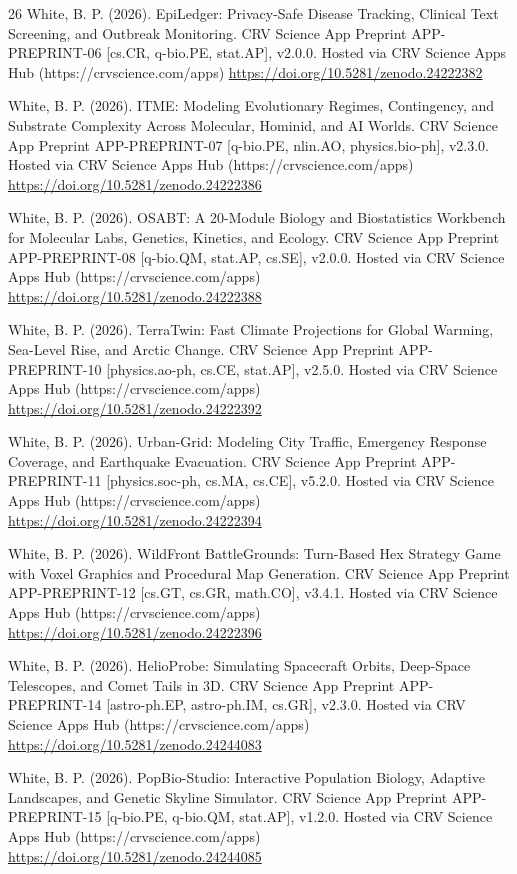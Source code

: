 \documentclass[10pt,letterpaper]{article}
\begin{document}
\begin{thebibliography}{26}
 White, B. P. (2026). EpiLedger: Privacy-Safe Disease Tracking, Clinical Text Screening, and Outbreak Monitoring. CRV Science App Preprint APP-PREPRINT-06 [cs.CR, q-bio.PE, stat.AP], v2.0.0. Hosted via CRV Science Apps Hub (https://crvscience.com/apps) \url{https://doi.org/10.5281/zenodo.24222382}

 White, B. P. (2026). ITME: Modeling Evolutionary Regimes, Contingency, and Substrate Complexity Across Molecular, Hominid, and AI Worlds. CRV Science App Preprint APP-PREPRINT-07 [q-bio.PE, nlin.AO, physics.bio-ph], v2.3.0. Hosted via CRV Science Apps Hub (https://crvscience.com/apps) \url{https://doi.org/10.5281/zenodo.24222386}

 White, B. P. (2026). OSABT: A 20-Module Biology and Biostatistics Workbench for Molecular Labs, Genetics, Kinetics, and Ecology. CRV Science App Preprint APP-PREPRINT-08 [q-bio.QM, stat.AP, cs.SE], v2.0.0. Hosted via CRV Science Apps Hub (https://crvscience.com/apps) \url{https://doi.org/10.5281/zenodo.24222388}

 White, B. P. (2026). TerraTwin: Fast Climate Projections for Global Warming, Sea-Level Rise, and Arctic Change. CRV Science App Preprint APP-PREPRINT-10 [physics.ao-ph, cs.CE, stat.AP], v2.5.0. Hosted via CRV Science Apps Hub (https://crvscience.com/apps) \url{https://doi.org/10.5281/zenodo.24222392}

 White, B. P. (2026). Urban-Grid: Modeling City Traffic, Emergency Response Coverage, and Earthquake Evacuation. CRV Science App Preprint APP-PREPRINT-11 [physics.soc-ph, cs.MA, cs.CE], v5.2.0. Hosted via CRV Science Apps Hub (https://crvscience.com/apps) \url{https://doi.org/10.5281/zenodo.24222394}

 White, B. P. (2026). WildFront BattleGrounds: Turn-Based Hex Strategy Game with Voxel Graphics and Procedural Map Generation. CRV Science App Preprint APP-PREPRINT-12 [cs.GT, cs.GR, math.CO], v3.4.1. Hosted via CRV Science Apps Hub (https://crvscience.com/apps) \url{https://doi.org/10.5281/zenodo.24222396}

 White, B. P. (2026). HelioProbe: Simulating Spacecraft Orbits, Deep-Space Telescopes, and Comet Tails in 3D. CRV Science App Preprint APP-PREPRINT-14 [astro-ph.EP, astro-ph.IM, cs.GR], v2.3.0. Hosted via CRV Science Apps Hub (https://crvscience.com/apps) \url{https://doi.org/10.5281/zenodo.24244083}

 White, B. P. (2026). PopBio-Studio: Interactive Population Biology, Adaptive Landscapes, and Genetic Skyline Simulator. CRV Science App Preprint APP-PREPRINT-15 [q-bio.PE, q-bio.QM, stat.AP], v1.2.0. Hosted via CRV Science Apps Hub (https://crvscience.com/apps) \url{https://doi.org/10.5281/zenodo.24244085}


\end{thebibliography}
\end{document}
